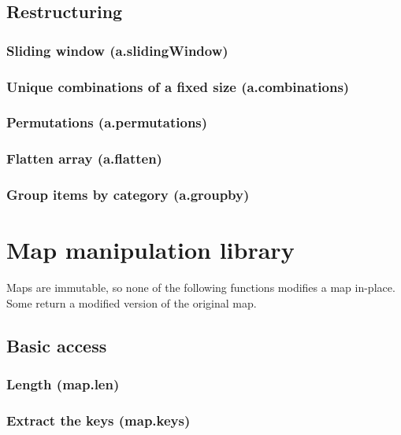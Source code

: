 \documentclass{article}
\theoremstyle{definition}
\begin{document}
\subsection{Restructuring}

\subsubsection{Sliding window (a.slidingWindow)}

\subsubsection{Unique combinations of a fixed size (a.combinations)}

\subsubsection{Permutations (a.permutations)}

\subsubsection{Flatten array (a.flatten)}

\subsubsection{Group items by category (a.groupby)}

\pagebreak

\section{Map manipulation library}

Maps are immutable, so none of the following functions modifies a map in-place.  Some return a modified version of the original map.

\subsection{Basic access}

\subsubsection{Length (map.len)}

\subsubsection{Extract the keys (map.keys)}
\end{document}
